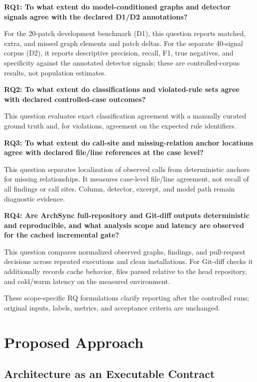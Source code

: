 \documentclass[conference]{IEEEtran}
\begin{document}
\textbf{RQ1: To what extent do model-conditioned graphs and detector signals agree with the declared D1/D2 annotations?}

For the 20-patch development benchmark (D1), this question reports matched, extra, and missed graph elements and patch deltas. For the separate 40-signal corpus (D2), it reports descriptive precision, recall, F1, true negatives, and specificity against the annotated detector signals; these are controlled-corpus results, not population estimates.

\textbf{RQ2: To what extent do classifications and violated-rule sets agree with declared controlled-case outcomes?}

This question evaluates exact classification agreement with a manually curated ground truth and, for violations, agreement on the expected rule identifiers.

\textbf{RQ3: To what extent do call-site and missing-relation anchor locations agree with declared file/line references at the case level?}

This question separates localization of observed calls from deterministic anchors for missing relationships. It measures case-level file/line agreement, not recall of all findings or call sites. Column, detector, excerpt, and model path remain diagnostic evidence.

\textbf{RQ4: Are ArchSync full-repository and Git-diff outputs deterministic and reproducible, and what analysis scope and latency are observed for the cached incremental gate?}

This question compares normalized observed graphs, findings, and pull-request decisions across repeated executions and clean installations. For Git-diff checks it additionally records cache behavior, files parsed relative to the head repository, and cold/warm latency on the measured environment.

These scope-specific RQ formulations clarify reporting after the controlled runs; original inputs, labels, metrics, and acceptance criteria are unchanged.

\section{Proposed Approach}

\subsection{Architecture as an Executable Contract}
\end{document}
